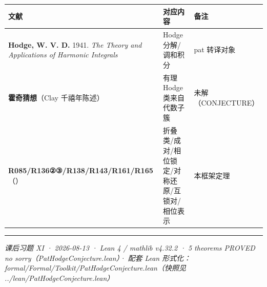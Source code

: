 \documentclass[
]{article}
\newcounter{none} %
\begin{document}
{\def\LTcaptype{none} %
\begin{longtable}[]{@{}
 >{\raggedright\arraybackslash}p{}
 >{\raggedright\arraybackslash}p{}
 >{\raggedright\arraybackslash}p{}@{}}
\toprule\noalign{}
\begin{minipage}[b]{\linewidth}\raggedright
文献
\end{minipage} & \begin{minipage}[b]{\linewidth}\raggedright
对应内容
\end{minipage} & \begin{minipage}[b]{\linewidth}\raggedright
备注
\end{minipage} \\
\midrule\noalign{}
\endhead
\bottomrule\noalign{}
\endlastfoot
\textbf{Hodge, W. V. D.} 1941. \emph{The Theory and Applications of
Harmonic Integrals} & Hodge 分解/调和积分 & pat 转译对象 \\
\textbf{霍奇猜想}（Clay 千禧年陈述） & 有理 Hodge 类来自代数子簇 &
未解（CONJECTURE） \\
\textbf{R085/R136②③/R138/R143/R161/R165}（） &
折叠类/成对/相位锁定/对称还原/互锁对/相位表示 & 本框架定理 \\
\end{longtable}
}

\begin{center}\rule{0.5\linewidth}{0.5pt}\end{center}

\emph{课后习题 XI · 2026-08-13 · Lean 4 / mathlib v4.32.2 · 5
theorems PROVED no sorry（PatHodgeConjecture.lean）· 配套 Lean
形式化：formal/Formal/Toolkit/PatHodgeConjecture.lean（快照见
../lean/PatHodgeConjecture.lean）}
\end{document}
